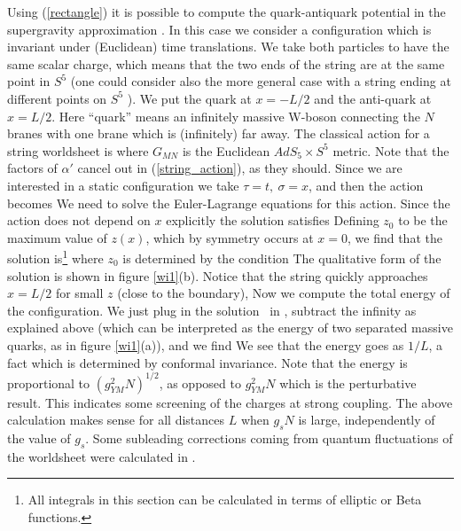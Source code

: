 Using (\ref{rectangle}) it is possible to compute the quark-antiquark
potential in the supergravity approximation
\cite{Rey:1998ik,Maldacena:1998im}. In this case we consider a
configuration which is invariant under (Euclidean) time translations.
We take both particles to have the same scalar charge, which means
that the two ends of the string are at the same point in $S^5$ (one
could consider also the more general case
with a string ending at different points on $S^5$ \cite{Maldacena:1998im}). 
We put the quark at $x = -L/2$ and the
anti-quark at $x = L/2$. Here ``quark'' means an infinitely massive
W-boson connecting the $N$ branes with one brane which is (infinitely)
far away.  The classical action for a string worldsheet is
where $G_{MN}$ is the Euclidean $AdS_5\times S^5$ metric.
 Note that
the factors of $\alpha'$ cancel out in (\ref{string_action}), as they should.
Since we are interested in a  static configuration we take
$\tau =t, ~ \sigma = x$, and then the action  becomes
We need  to solve the Euler-Lagrange equations for this action.
Since the action does not depend on $x$ explicitly 
 the solution satisfies
Defining $z_0$ to be the maximum value of $z(x)$, which by symmetry 
occurs at $x=0$, we find that the solution is\footnote{
All  integrals in this section
can be calculated in terms of elliptic or Beta  functions.}
where $z_0$ is determined by the condition
The qualitative form of the solution is shown in figure \ref{wi1}(b).
Notice that the  string quickly approaches $x =L/2$ 
for small $z$ (close to the boundary),
Now we  compute the total energy of the configuration.
We just plug in the solution \sol\ in \act , subtract the infinity
as explained above (which can be interpreted as the energy of two
separated massive quarks, as in figure \ref{wi1}(a)), and we find
We see that the energy goes as $1/L$, a fact  which is determined by
 conformal invariance. 
Note that 
the energy is proportional to $(g_{YM}^2 N)^{1/2}$, 
as opposed to $g_{YM}^2 N$ which is the
perturbative result. 
This  indicates some screening of the charges at strong coupling. 
The above calculation makes sense for all distances $L$
when $g_s N$ is large, independently of the value of $g_s$.
Some subleading 
 corrections coming from quantum fluctuations of the worldsheet
were calculated in \cite{Forste:1999qn,Naik:1999bs,Greensite:1999wf}.



